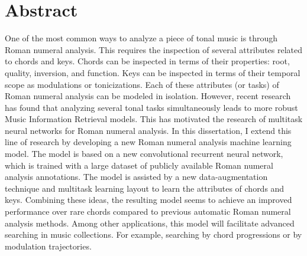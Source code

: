 \chapter*{Abstract}
\label{chap:abstract-en}

One of the most common ways to analyze a piece of tonal
music is through Roman numeral analysis. This requires the
inspection of several attributes related to chords and keys.
Chords can be inspected in terms of their properties: root,
quality, inversion, and function. Keys can be inspected in
terms of their temporal scope as modulations or
tonicizations. Each of these attributes (or tasks) of Roman
numeral analysis can be modeled in isolation. However,
recent research has found that analyzing several tonal tasks
simultaneously leads to more robust Music Information
Retrieval models. This has motivated the research of
multitask neural networks for Roman numeral analysis.
In this dissertation, I extend this line of research by
developing a new Roman numeral analysis machine learning
model. The model is based on a new convolutional recurrent
neural network, which is trained with a large dataset of
publicly available Roman numeral analysis annotations. The
model is assisted by a new data-augmentation technique and
multitask learning layout to learn the attributes of chords
and keys. Combining these ideas, the resulting model seems
to achieve an improved performance over rare chords compared
to previous automatic Roman numeral analysis methods. Among
other applications, this model will facilitate advanced
searching in music collections. For example, searching by
chord progressions or by modulation trajectories.
